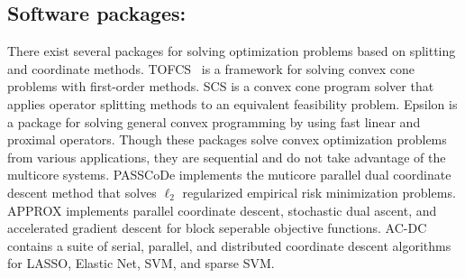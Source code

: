 \subsection*{Software packages:}
There exist several packages for solving optimization problems based on splitting and coordinate methods. 
TOFCS~\citep{becker2011templates} is a framework for solving convex cone problems with first-order methods. 
SCS \citep{ocpb:16} is a convex cone program solver that applies operator splitting methods to an equivalent feasibility problem. 
Epsilon \citep{wytock2015convex} is a package for solving general convex programming by using fast linear and proximal operators.
Though these packages solve convex optimization problems from various applications, they are sequential and do not take advantage of
the multicore systems.  
PASSCoDe \citep{hsieh2015passcode} implements the muticore parallel dual coordinate descent method that solves $\ell_2$ regularized 
empirical risk minimization problems.
APPROX\citep{fercoq2015accelerated} implements  parallel coordinate descent, stochastic dual ascent, and accelerated gradient descent for block seperable objective functions.
AC-DC\citep{richtarik2016parallel} contains a suite of serial, parallel, and distributed coordinate descent algorithms for LASSO, Elastic Net, SVM, and sparse SVM.

